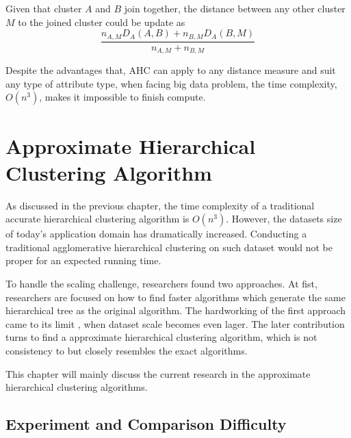 \documentclass[utf8,english]{gradu3}
\begin{document}

\begin{definition}
	\label{def:average_updating}
	Given that cluster $A$ and $B$ join together, the distance between any other cluster $M$ to the joined cluster could be update as
	\[
	\frac{
		n_{A,M} D_A \left( A, B \right) + n_{B,M} D_A \left( B, M \right)
		}{
		n_{A, M} + n_{B,M}
		}
\]
\end{definition}


Despite the advantages that, AHC can apply to any distance measure and suit any type of attribute type, when facing big data problem, the time complexity, $O(n^3)$, makes it impossible to finish compute.


\chapter{Approximate Hierarchical Clustering Algorithm}

As discussed in the previous chapter, the time complexity of a traditional accurate hierarchical clustering algorithm is $O(n^3)$. 
However, the datasets size of today's application domain has dramatically increased. Conducting a traditional agglomerative hierarchical clustering on such dataset would not be proper for an expected running time.

To handle the scaling challenge, researchers found two approaches. At fist, researchers are focused on how to find faster algorithms which generate the same hierarchical tree as the original algorithm. The hardworking of the first approach came to its limit
, when dataset scale becomes even lager. The later contribution turns to find a approximate hierarchical clustering algorithm, which is not consistency to but closely resembles the exact algorithms. 

This chapter will mainly discuss the current research in the approximate hierarchical clustering algorithms. 

\section{Experiment and Comparison Difficulty}
\end{document}
